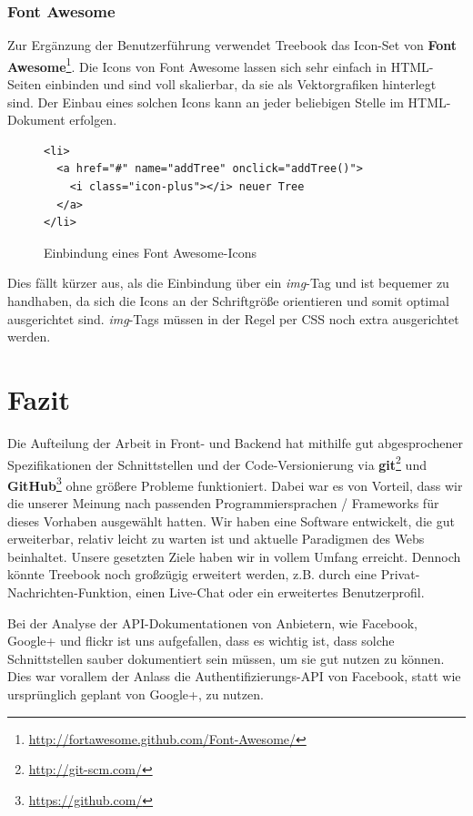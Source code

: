\documentclass[10pt,a4paper]{book}
\begin{document}
\subsection{Font Awesome}
Zur Ergänzung der Benutzerführung verwendet Treebook das Icon-Set von \textbf{Font Awesome}\footnote{\href{http://fortawesome.github.com/Font-Awesome/}{http://fortawesome.github.com/Font-Awesome/}}.
Die Icons von Font Awesome lassen sich sehr einfach in HTML-Seiten einbinden und sind voll skalierbar, da sie als Vektorgrafiken hinterlegt sind.
Der Einbau eines solchen Icons kann an jeder beliebigen Stelle im HTML-Dokument erfolgen.
\begin{figure}[htbp]
\centering
\begin{lstlisting}
<li>
  <a href="#" name="addTree" onclick="addTree()">
    <i class="icon-plus"></i> neuer Tree
  </a>
</li>
\end{lstlisting}
\caption{Einbindung eines Font Awesome-Icons}%
\end{figure}
Dies fällt kürzer aus, als die Einbindung über ein \textit{img}-Tag und ist bequemer zu handhaben, da sich die Icons an der Schriftgröße orientieren und somit optimal ausgerichtet sind. \textit{img}-Tags müssen in der Regel per CSS noch extra ausgerichtet werden.

\chapter{Fazit}
Die Aufteilung der Arbeit in Front- und Backend hat mithilfe gut abgesprochener Spezifikationen der Schnittstellen und der Code-Versionierung via \textbf{git}\footnote{\href{http://git-scm.com/}{http://git-scm.com/}} und \textbf{GitHub}\footnote{\href{https://github.com/}{https://github.com/}} ohne größere Probleme funktioniert. Dabei war es von Vorteil, dass wir die unserer Meinung nach passenden Programmiersprachen / Frameworks für dieses Vorhaben ausgewählt hatten.
Wir haben eine Software entwickelt, die gut erweiterbar, relativ leicht zu warten ist und aktuelle Paradigmen des Webs beinhaltet.
Unsere gesetzten Ziele haben wir in vollem Umfang erreicht. Dennoch könnte Treebook noch großzügig erweitert werden, z.B. durch eine Privat-Nachrichten-Funktion, einen Live-Chat oder ein erweitertes Benutzerprofil.

Bei der Analyse der API-Dokumentationen von Anbietern, wie Facebook, Google+ und flickr ist uns aufgefallen, dass es wichtig ist, dass solche Schnittstellen sauber dokumentiert sein müssen, um sie gut nutzen zu können. Dies war vorallem der Anlass die Authentifizierungs-API von Facebook, statt wie ursprünglich geplant von Google+, zu nutzen.
\end{document}

